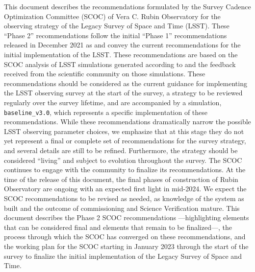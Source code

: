 
This document describes the recommendations formulated by the Survey Cadence Optimization Committee (SCOC) of Vera C. Rubin Observatory for the observing strategy of the Legacy Survey of Space and Time (LSST). These ``Phase 2'' recommendations follow the initial ``Phase 1'' recommendations released in December 2021 as  and convey the current recommendations for the initial implementation of the LSST. These recommendations are based on the SCOC analysis of LSST simulations generated according to  and the feedback received from the scientific community on those simulations. These recommendations should be considered as the current guidance for implementing the LSST observing survey at the start of the survey, a strategy to be reviewed regularly over the survey lifetime, and are accompanied by a simulation, \texttt{baseline\_v3.0}, which represents a specific implementation of these recommendations. While these recommendations dramatically narrow the possible LSST observing parameter choices, we emphasize that at this stage they do not yet represent a final or complete set of recommendations for the survey strategy, and several details are still to be refined. Furthermore, the strategy should be considered ``living'' and subject to evolution throughout the survey. The SCOC continues to engage with the community to finalize its recommendations. At the time of the release of this document, the final phases of construction of Rubin Observatory are ongoing with an expected first light in mid-2024. We expect the SCOC recommendations to be revised as needed, as knowledge of the system as built and the outcome of commissioning and Science Verification mature. This document describes the Phase 2 SCOC recommendations ---highlighting elements that can be considered final and elements that remain to be finalized---, the process through which the SCOC has converged on these recommendations, and the working plan for the SCOC starting in January 2023 through the start of the survey to finalize the initial implementation of the Legacy Survey of Space and Time.

